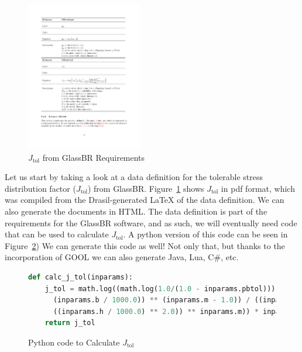 \documentclass[sigconf]{acmart}
\newcommand{\jtol}{$J_{\mbox{tol}}$}
\begin{document}

\begin{figure}
\begin{center}
\includegraphics[width=0.45\textwidth]{./figures/Jtol_pdf.pdf}
\end{center}
\caption{\jtol{} from GlassBR Requirements}
\label{Fig_Jtolpdf}
\end{figure}

Let us start by taking a look at a data definition for the tolerable stress
distribution factor (\jtol{}) from GlassBR. Figure~\ref{Fig_Jtolpdf} shows
\jtol{} in pdf format, which was compiled from the Drasil-generated LaTeX
of the data definition. We can also generate the documents in HTML. The data definition is part
of the requirements for the GlassBR software, and as such, we will eventually
need code that can be used to calculate \jtol{}.  A python version of this code
can be seen in Figure~\ref{Fig_JtolPython}) We can generate this code as well!
Not only that, but thanks to the incorporation of GOOL we can also generate
Java, Lua, C\#, etc.

\begin{figure}
\begin{lstlisting}[language=python, frame=single, showstringspaces=false]
def calc_j_tol(inparams):
    j_tol = math.log((math.log(1.0/(1.0 - inparams.pbtol))) * ((((inparams.a / 1000.0) * 
      (inparams.b / 1000.0)) ** (inparams.m - 1.0)) / ((inparams.k * (((inparams.E * 1000.0) * 
      ((inparams.h / 1000.0) ** 2.0)) ** inparams.m)) * inparams.ldf))) 
    return j_tol
\end{lstlisting}
\caption{Python code to Calculate \jtol{}}
\label{Fig_JtolPython}
\end{figure}
\end{document}

